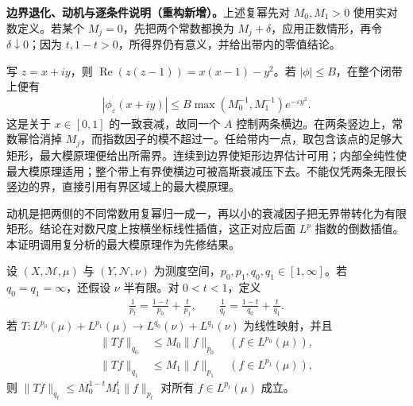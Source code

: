 \documentclass[../../main.tex]{subfiles}
\begin{document}
\begin{remark}
\textbf{边界退化、动机与逐条件说明（重构新增）。}上述复幂先对 $M_0,M_1>0$ 使用实对数定义。若某个 $M_j=0$，先把两个常数都换为 $M_j+\delta$，应用正数情形，再令 $\delta\downarrow0$；因为 $t,1-t>0$，所得界仍有意义，并给出带内的零值结论。

写 $z=x+iy$，则 $\operatorname{Re}(z(z-1))=x(x-1)-y^2$。若 $|\phi|\leqslant B$，在整个闭带上便有
\begin{align*}
|\phi_\varepsilon(x+iy)|
\leqslant B\max(M_0^{-1},M_1^{-1})e^{-\varepsilon y^2}.
\end{align*}
这是关于 $x\in[0,1]$ 的一致衰减，故同一个 $A$ 控制两条横边。在两条竖边上，常数幂恰消掉 $M_j$，而指数因子的模不超过一。任给带内一点，取包含该点的足够大矩形，最大模原理便给出所需界。连续到边界使矩形边界估计可用；内部全纯性使最大模原理适用；整个带上有界使横边可被高斯衰减压下去。不能仅凭两条无限长竖边的界，直接引用有界区域上的最大模原理。

动机是把两侧的不同常数用复幂归一成一，再以小的衰减因子把无界带转化为有限矩形。结论在对数尺度上按横坐标线性插值，这正对应后面 $L^p$ 指数的倒数插值。本证明调用复分析的最大模原理作为先修结果。
\end{remark}
\begin{theorem}\label{theorem:ch06-riesz-thorin}
设 $(X,\mathscr M,\mu)$ 与 $(Y,\mathscr N,\nu)$ 为测度空间，$p_0,p_1,q_0,q_1\in[1,\infty]$。若 $q_0=q_1=\infty$，还假设 $\nu$ 半有限。对 $0<t<1$，定义
\begin{align*}
\frac1{p_t}=\frac{1-t}{p_0}+\frac t{p_1},\qquad
\frac1{q_t}=\frac{1-t}{q_0}+\frac t{q_1}.
\end{align*}
若 $T:L^{p_0}(\mu)+L^{p_1}(\mu)\to L^{q_0}(\nu)+L^{q_1}(\nu)$ 为线性映射，并且
\begin{align*}
\|Tf\|_{q_0}&\leqslant M_0\|f\|_{p_0}\quad(f\in L^{p_0}(\mu)),\\
\|Tf\|_{q_1}&\leqslant M_1\|f\|_{p_1}\quad(f\in L^{p_1}(\mu)),
\end{align*}
则 $\|Tf\|_{q_t}\leqslant M_0^{1-t}M_1^t\|f\|_{p_t}$ 对所有 $f\in L^{p_t}(\mu)$ 成立。
\end{theorem}
\end{document}
